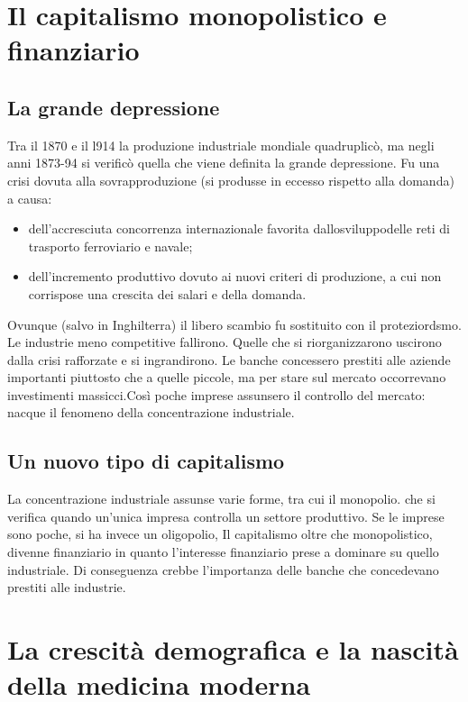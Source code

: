 \documentclass{report}
\begin{document}
\section{Il capitalismo monopolistico e finanziario}
\subsection{La grande depressione}
Tra il 1870 e il l914 la produzione industriale mondiale quadruplicò, ma negli anni 1873-94 si verificò quella che viene definita la grande depressione. Fu una crisi dovuta alla sovrapproduzione (si produsse in eccesso rispetto alla domanda) a causa:

\begin{itemize}
  \item dell'accresciuta concorrenza internazionale favorita dallosviluppodelle reti di trasporto ferroviario e navale;
  \item dell'incremento produttivo dovuto ai nuovi criteri di produzione, a cui non corrispose una crescita dei salari e della domanda.
\end{itemize}

Ovunque (salvo in Inghilterra) il libero scambio fu sostituito con il proteziordsmo. Le industrie meno competitive fallirono. Quelle che si riorganizzarono uscirono dalla crisi rafforzate e si ingrandirono. Le banche concessero prestiti alle aziende importanti piuttosto che a quelle piccole, ma per stare sul mercato occorrevano investimenti massicci.Così poche imprese assunsero il controllo del mercato: nacque il fenomeno della concentrazione industriale.

\subsection{Un nuovo tipo di capitalismo}
La concentrazione industriale assunse varie forme, tra cui il monopolio. che si verifica quando un'unica impresa controlla un settore produttivo. Se le imprese sono poche, si ha invece un oligopolio, Il capitalismo oltre che monopolistico, divenne finanziario in quanto l'interesse finanziario prese a dominare su quello industriale. Di conseguenza crebbe l'importanza delle banche che concedevano prestiti alle industrie.

\section{La crescità demografica e la nascità della medicina moderna}
\end{document}
